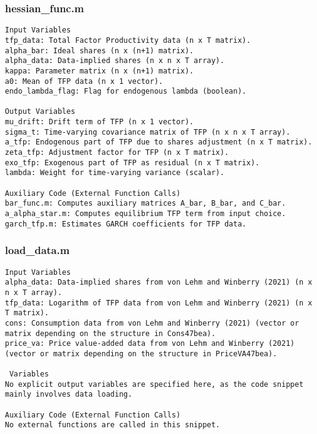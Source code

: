 \documentclass[11pt]{article}
\theoremstyle{definition}
\newcommand{\codepath}{F:/12004835/replication_package_final/replication_package_final}
\begin{document}
	
	
	\subsubsection{hessian\_func.m}
	\begin{lstlisting}[style=Matlab]
Input Variables
tfp_data: Total Factor Productivity data (n x T matrix).
alpha_bar: Ideal shares (n x (n+1) matrix).
alpha_data: Data-implied shares (n x n x T array).
kappa: Parameter matrix (n x (n+1) matrix).
a0: Mean of TFP data (n x 1 vector).
endo_lambda_flag: Flag for endogenous lambda (boolean).

Output Variables
mu_drift: Drift term of TFP (n x 1 vector).
sigma_t: Time-varying covariance matrix of TFP (n x n x T array).
a_tfp: Endogenous part of TFP due to shares adjustment (n x T matrix).
zeta_tfp: Adjustment factor for TFP (n x T matrix).
exo_tfp: Exogenous part of TFP as residual (n x T matrix).
lambda: Weight for time-varying variance (scalar).

Auxiliary Code (External Function Calls)
bar_func.m: Computes auxiliary matrices A_bar, B_bar, and C_bar.
a_alpha_star.m: Computes equilibrium TFP term from input choice.
garch_tfp.m: Estimates GARCH coefficients for TFP data.
	\end{lstlisting}
	
	
	
	
	\subsubsection{load\_data.m}
	\begin{lstlisting}[style=Matlab]
Input Variables
alpha_data: Data-implied shares from von Lehm and Winberry (2021) (n x n x T array).
tfp_data: Logarithm of TFP data from von Lehm and Winberry (2021) (n x T matrix).
cons: Consumption data from von Lehm and Winberry (2021) (vector or matrix depending on the structure in Cons47bea).
price_va: Price value-added data from von Lehm and Winberry (2021) (vector or matrix depending on the structure in PriceVA47bea).

 Variables
No explicit output variables are specified here, as the code snippet mainly involves data loading.

Auxiliary Code (External Function Calls)
No external functions are called in this snippet.
	\end{lstlisting}
	
	
\end{document}
